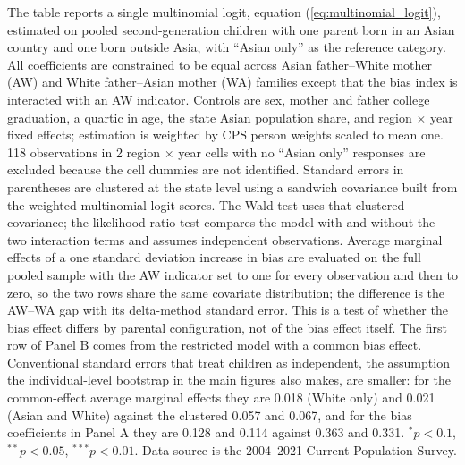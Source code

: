 \documentclass[12pt,english]{article}
\providecommand{\DIFaddtex}[1]{{\protect\color{blue}\uwave{#1}}} %
\providecommand{\DIFaddFL}[1]{\DIFadd{#1}} %
\providecommand{\DIFadd}[1]{\texorpdfstring{\DIFaddtex{#1}}{#1}} %
\begin{document}
\begin{table}[H]
\begin{threeparttable}
\begin{tabular}{lcc}
\bottomrule
\end{tabular}
\begin{tablenotes}
\small
\item[\DIFaddFL{1}] \footnotesize{The table reports a single multinomial logit, equation (\ref{eq:multinomial_logit}), estimated on pooled second-generation children with one parent born in an Asian country and one born outside Asia, with ``Asian only'' as the reference category. All coefficients are constrained to be equal across Asian father--White mother (AW) and White father--Asian mother (WA) families except that the bias index is interacted with an AW indicator. Controls are sex, mother and father college graduation, a quartic in age, the state Asian population share, and region $\times$ year fixed effects; estimation is weighted by CPS person weights scaled to mean one. 118 observations in 2 region $\times$ year cells with no ``Asian only'' responses are excluded because the cell dummies are not identified. Standard errors in parentheses are clustered at the state level using a sandwich covariance built from the weighted multinomial logit scores. The Wald test uses that clustered covariance; the likelihood-ratio test compares the model with and without the two interaction terms and assumes independent observations. Average marginal effects of a one standard deviation increase in bias are evaluated on the full pooled sample with the AW indicator set to one for every observation and then to zero, so the two rows share the same covariate distribution; the difference is the AW--WA gap with its delta-method standard error. This is a test of whether the bias effect differs by parental configuration, not of the bias effect itself. The first row of Panel B comes from the restricted model with a common bias effect. Conventional standard errors that treat children as independent, the assumption the individual-level bootstrap in the main figures also makes, are smaller: for the common-effect average marginal effects they are 0.018 (White only) and 0.021 (Asian and White) against the clustered 0.057 and 0.067, and for the bias coefficients in Panel A they are 0.128 and 0.114 against 0.363 and 0.331. $^{*}p<0.1$, $^{**}p<0.05$, $^{***}p<0.01$. Data source is the 2004--2021 Current Population Survey.}
\end{tablenotes}
\end{threeparttable}
\end{table}


\pagebreak
\newpage
\end{document}
